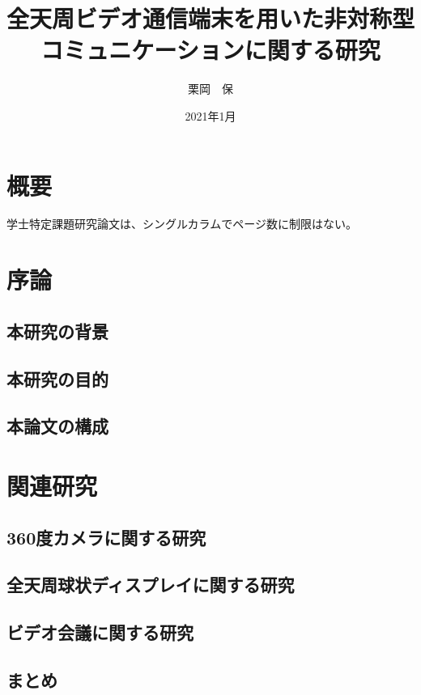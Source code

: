 \documentclass[a4j,11pt,oneside,openany,report,draft]{jsbook}
\title{全天周ビデオ通信端末を用いた非対称型コミュニケーションに関する研究}
\author{栗岡　保}
\affiliation{東京工業大学\\情報理工学院\\情報工学系}
\date{2021年1月}
\begin{document}
\frontmatter
\maketitle

\chapter{概要}
学士特定課題研究論文は、シングルカラムでページ数に制限はない。

\tableofcontents
\listoffigures
\listoftables


\mainmatter
\chapter{序論}

\section{本研究の背景}
\section{本研究の目的}
\section{本論文の構成}

\chapter{関連研究}
\section{360度カメラに関する研究}
\section{全天周球状ディスプレイに関する研究}
\section{ビデオ会議に関する研究}
\section{まとめ}
\end{document}
